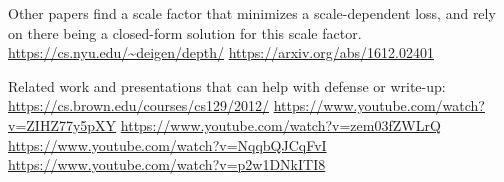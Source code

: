 Other papers find a scale factor that minimizes a scale-dependent loss, and rely on there being a closed-form solution for this scale factor.
\url{https://cs.nyu.edu/~deigen/depth/}
\url{https://arxiv.org/abs/1612.02401}

Related work and presentations that can help with defense or write-up:
\url{https://cs.brown.edu/courses/cs129/2012/}
\url{https://www.youtube.com/watch?v=ZIHZ77y5pXY}
\url{https://www.youtube.com/watch?v=zem03fZWLrQ}
\url{https://www.youtube.com/watch?v=NqqbQJCqFvI}
\url{https://www.youtube.com/watch?v=p2w1DNkITI8}
